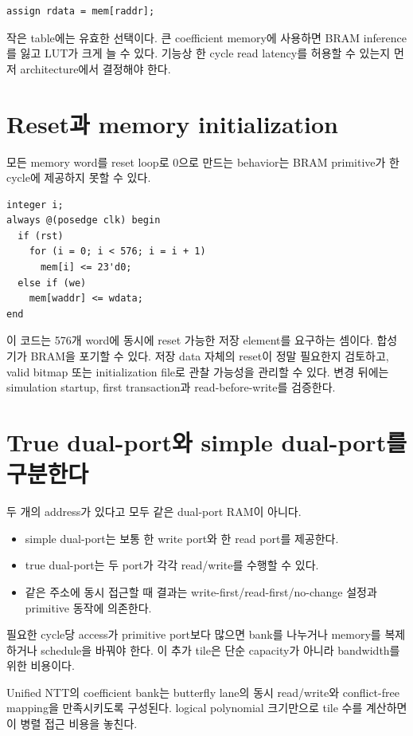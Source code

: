 \begin{lstlisting}
assign rdata = mem[raddr];
\end{lstlisting}

작은 table에는 유효한 선택이다. 큰 coefficient memory에 사용하면 BRAM inference를
잃고 LUT가 크게 늘 수 있다. 기능상 한 cycle read latency를 허용할 수 있는지 먼저
architecture에서 결정해야 한다.

\section{Reset과 memory initialization}

모든 memory word를 reset loop로 0으로 만드는 behavior는 BRAM primitive가 한
cycle에 제공하지 못할 수 있다.

\begin{lstlisting}
integer i;
always @(posedge clk) begin
  if (rst)
    for (i = 0; i < 576; i = i + 1)
      mem[i] <= 23'd0;
  else if (we)
    mem[waddr] <= wdata;
end
\end{lstlisting}

이 코드는 576개 word에 동시에 reset 가능한 저장 element를 요구하는 셈이다.
합성기가 BRAM을 포기할 수 있다. 저장 data 자체의 reset이 정말 필요한지 검토하고,
valid bitmap 또는 initialization file로 관찰 가능성을 관리할 수 있다. 변경 뒤에는
simulation startup, first transaction과 read-before-write를 검증한다.

\section{True dual-port와 simple dual-port를 구분한다}

두 개의 address가 있다고 모두 같은 dual-port RAM이 아니다.

\begin{itemize}
  \item simple dual-port는 보통 한 write port와 한 read port를 제공한다.
  \item true dual-port는 두 port가 각각 read/write를 수행할 수 있다.
  \item 같은 주소에 동시 접근할 때 결과는 write-first/read-first/no-change 설정과
        primitive 동작에 의존한다.
\end{itemize}

필요한 cycle당 access가 primitive port보다 많으면 bank를 나누거나 memory를
복제하거나 schedule을 바꿔야 한다. 이 추가 tile은 단순 capacity가 아니라
bandwidth를 위한 비용이다.

Unified NTT의 coefficient bank는 butterfly lane의 동시 read/write와 conflict-free
mapping을 만족시키도록 구성된다. logical polynomial 크기만으로 tile 수를 계산하면
이 병렬 접근 비용을 놓친다.


